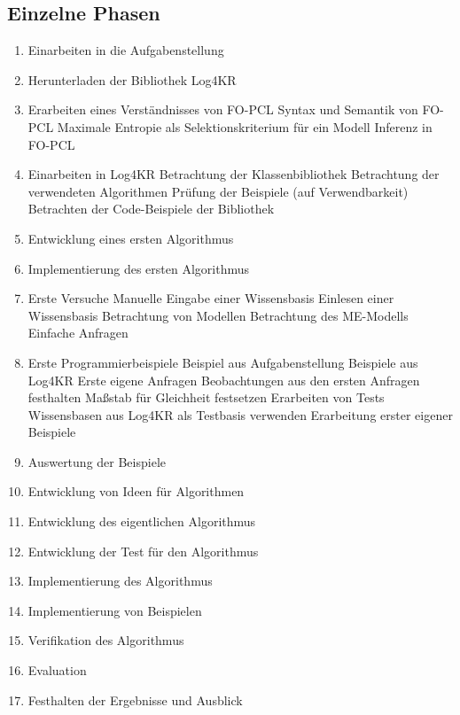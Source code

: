 \documentclass[a4paper, 11pt]{book}
\begin{document}
\subsection{Einzelne Phasen}

\begin{enumerate}
	\item Einarbeiten in die Aufgabenstellung
	\item Herunterladen der Bibliothek Log4KR
	\item Erarbeiten eines Verständnisses von FO-PCL
	\subitem Syntax und Semantik von FO-PCL
	\subitem Maximale Entropie als Selektionskriterium für ein Modell
	\subitem Inferenz in FO-PCL
	\item Einarbeiten in Log4KR
	\subitem Betrachtung der Klassenbibliothek 
	\subitem Betrachtung der verwendeten Algorithmen
	\subitem Prüfung der Beispiele (auf Verwendbarkeit)
	\subitem Betrachten der Code-Beispiele der Bibliothek
	\item Entwicklung eines ersten Algorithmus
	\item Implementierung des ersten Algorithmus
	\item Erste Versuche 
	\subitem Manuelle Eingabe einer Wissensbasis
	\subitem Einlesen einer Wissensbasis
	\subitem Betrachtung von Modellen
	\subitem Betrachtung des ME-Modells
	\subitem Einfache Anfragen
	\item Erste Programmierbeispiele
	\subitem Beispiel aus Aufgabenstellung
	\subitem Beispiele aus Log4KR
	\subitem Erste eigene Anfragen
	\subitem Beobachtungen aus den ersten Anfragen festhalten
	\subitem Maßstab für Gleichheit festsetzen 
	\subitem Erarbeiten von Tests
	\subitem Wissensbasen aus Log4KR als Testbasis verwenden
	\subitem Erarbeitung erster eigener Beispiele
	\item Auswertung der Beispiele
	\item Entwicklung von Ideen für Algorithmen
	\item Entwicklung des eigentlichen Algorithmus
	\item Entwicklung der Test für den Algorithmus 
	\item Implementierung des Algorithmus
	\item Implementierung von Beispielen 
	\item Verifikation des Algorithmus 
	\item Evaluation
	\item Festhalten der Ergebnisse und Ausblick
	
\end{enumerate}
\end{document}
